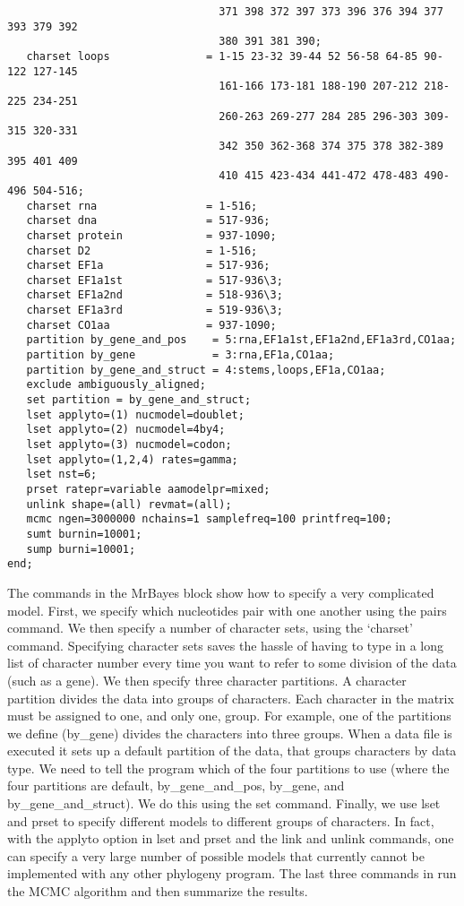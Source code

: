 \documentclass{svmult}
\begin{document}
\begin{verbatim}
                                 371 398 372 397 373 396 376 394 377 393 379 392 
                                 380 391 381 390;
   charset loops               = 1-15 23-32 39-44 52 56-58 64-85 90-122 127-145 
                                 161-166 173-181 188-190 207-212 218-225 234-251 
                                 260-263 269-277 284 285 296-303 309-315 320-331 
                                 342 350 362-368 374 375 378 382-389 395 401 409 
                                 410 415 423-434 441-472 478-483 490-496 504-516;
   charset rna                 = 1-516;
   charset dna                 = 517-936;
   charset protein             = 937-1090;
   charset D2                  = 1-516;
   charset EF1a                = 517-936;
   charset EF1a1st             = 517-936\3;
   charset EF1a2nd             = 518-936\3;
   charset EF1a3rd             = 519-936\3;
   charset CO1aa               = 937-1090;
   partition by_gene_and_pos    = 5:rna,EF1a1st,EF1a2nd,EF1a3rd,CO1aa;
   partition by_gene            = 3:rna,EF1a,CO1aa;
   partition by_gene_and_struct = 4:stems,loops,EF1a,CO1aa;
   exclude ambiguously_aligned;
   set partition = by_gene_and_struct;
   lset applyto=(1) nucmodel=doublet;
   lset applyto=(2) nucmodel=4by4;
   lset applyto=(3) nucmodel=codon;
   lset applyto=(1,2,4) rates=gamma;
   lset nst=6;
   prset ratepr=variable aamodelpr=mixed;
   unlink shape=(all) revmat=(all);
   mcmc ngen=3000000 nchains=1 samplefreq=100 printfreq=100;
   sumt burnin=10001;
   sump burni=10001;
end;
\end{verbatim}
The commands in the MrBayes block show how to specify a very complicated model. 
First, we specify which nucleotides pair with one
another using the pairs command. We then specify a number of character sets, 
using the `charset' command. Specifying character
sets saves the hassle of having to type in a long list of character number 
every time you want to refer to some division of the data (such as
a gene). We then specify three character partitions. A character 
partition divides the data into groups of characters. Each character in
the matrix must be assigned to one, and only one, group. For example, 
one of the partitions we define (by\_gene) divides  the characters
into three groups. When a data file is executed it sets up a default partition of the data, that groups characters by data type. We need to tell
the program which of the four partitions to use (where the four partitions are default, by\_gene\_and\_pos, by\_gene, and by\_gene\_and\_struct). We
do this using the set command. Finally, we use lset and prset to specify different models to different groups of characters. In fact, with the applyto option
in lset and prset and the link and unlink commands, one can specify a very large number of possible models that currently cannot be implemented with
any other phylogeny program. The last three commands in run the MCMC algorithm and then summarize the results.
\end{document}
